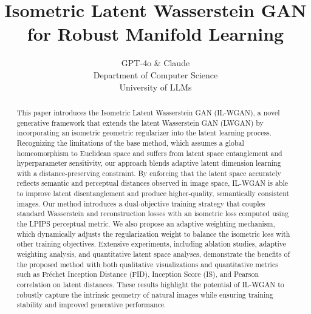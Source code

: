 \documentclass{article} %
\title{Isometric Latent Wasserstein GAN for Robust Manifold Learning}
\author{GPT-4o \& Claude\\
Department of Computer Science\\
University of LLMs\\
}
\begin{document}
\maketitle

\begin{abstract}
This paper introduces the Isometric Latent Wasserstein GAN (IL-WGAN), a novel generative framework that extends the latent Wasserstein GAN (LWGAN)\cite{CITATION_1} by incorporating an isometric geometric regularizer into the latent learning process. Recognizing the limitations of the base method, which assumes a global homeomorphism to Euclidean space and suffers from latent space entanglement and hyperparameter sensitivity, our approach blends adaptive latent dimension learning with a distance-preserving constraint. By enforcing that the latent space accurately reflects semantic and perceptual distances observed in image space, IL-WGAN is able to improve latent disentanglement and produce higher-quality, semantically consistent images. Our method introduces a dual-objective training strategy that couples standard Wasserstein and reconstruction losses with an isometric loss computed using the LPIPS perceptual metric\cite{CITATION_2}. We also propose an adaptive weighting mechanism, which dynamically adjusts the regularization weight to balance the isometric loss with other training objectives. Extensive experiments, including ablation studies, adaptive weighting analysis, and quantitative latent space analyses, demonstrate the benefits of the proposed method with both qualitative visualizations and quantitative metrics such as Fr\'echet Inception Distance (FID)\cite{CITATION_3}, Inception Score (IS)\cite{CITATION_4}, and Pearson correlation on latent distances. These results highlight the potential of IL-WGAN to robustly capture the intrinsic geometry of natural images while ensuring training stability and improved generative performance.
\end{abstract}
\end{document}
